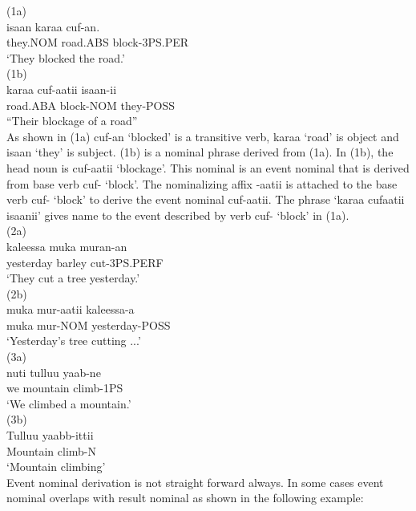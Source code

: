 \documentclass[11pt,a4paper]{article}
\begin{document}
(1a) 	\\
\indent isaan 		karaa 		cuf-an.\\
\indent they.NOM	road.ABS	block-3PS.PER\\
\indent ‘They blocked the road.’\\

(1b) 	\\
\indent karaa		cuf-aatii	isaan-ii\\
\indent road.ABA	block-NOM	they-POSS\\
\indent “Their blockage of a road”\\

As shown in (1a) cuf-an ‘blocked’ is a transitive verb, karaa ‘road’ is object and isaan ‘they’ is subject. (1b) is a nominal phrase derived from (1a). In (1b), the head noun is cuf-aatii ‘blockage’. This nominal is an event nominal that is derived from base verb cuf- ‘block’. The nominalizing affix -aatii is attached to the base verb cuf- ‘block’ to derive the event nominal cuf-aatii. The phrase ‘karaa cufaatii isaanii’ gives name to the event described by verb cuf- ‘block’ in (1a). \\

(2a) 	\\
\indent kaleessa 		muka 		muran-an\\
\indent yesterday		barley		cut-3PS.PERF\\
\indent ‘They cut a tree yesterday.’\\


(2b)	\\
\indent muka		mur-aatii	kaleessa-a\\
\indent muka		mur-NOM	yesterday-POSS\\
\indent ‘Yesterday’s tree cutting ...’\\


(3a) 	\\
\indent nuti 		tulluu 		yaab-ne 	\\	
\indent we		mountain	climb-1PS\\
\indent ‘We climbed a mountain.’\\


(3b) \\
\indent Tulluu yaabb-ittii 	\\	
\indent Mountain climb-N	\\
\indent ‘Mountain climbing’\\

Event nominal derivation is not straight forward always. In some cases event nominal overlaps with result nominal as shown in the following example:\\
\end{document}
